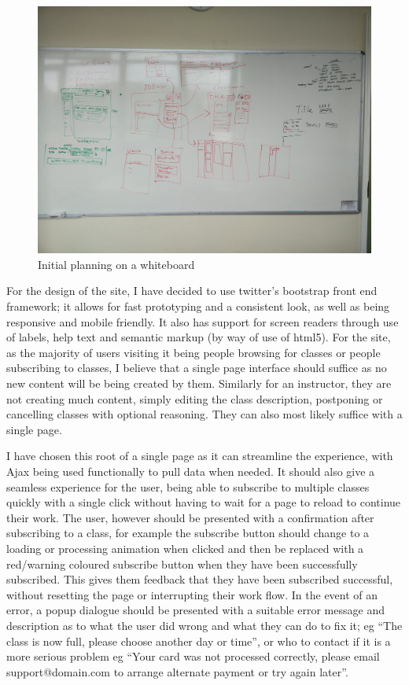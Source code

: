 \documentclass[10pt]{article}
\begin{document}
      \begin{figure}[p]
        \centering
        \includegraphics[width=1\textwidth]{prototype.jpg}
        \caption{Initial planning on a whiteboard}
        \label{fig:plan}
      \end{figure}

      For the design of the site, I have decided to use twitter's bootstrap front end framework; it allows for fast prototyping and a consistent look, as well as being responsive and mobile friendly. It also has support for screen readers through use of labels, help text and semantic markup (by way of use of html5).\cite{bootstrapScreenReader} For the site, as the majority of users visiting it being people browsing for classes or people subscribing to classes, I believe that a single page interface should suffice as no new content will be being created by them. Similarly for an instructor, they are not creating much content, simply editing the class description, postponing or cancelling classes with optional reasoning. They can also most likely suffice with a single page. 

      I have chosen this root of a single page as it can streamline the experience, with Ajax being used functionally to pull data when needed. It should also give a seamless experience for the user, being able to subscribe to multiple classes quickly with a single click without having to wait for a page to reload to continue their work. The user, however should be presented with a confirmation after subscribing to a class, for example the subscribe button should change to a loading or processing animation when clicked and then be replaced with a red/warning coloured subscribe button when they have been successfully subscribed. This gives them feedback that they have been subscribed successful, without resetting the page or interrupting their work flow. In the event of an error, a popup dialogue should be presented with a suitable error message and description as to what the user did wrong and what they can do to fix it; eg ``The class is now full, please choose another day or time'', or who to contact if it is a more serious problem eg ``Your card was not processed correctly, please email support@domain.com to arrange alternate payment or try again later''.
\end{document}
